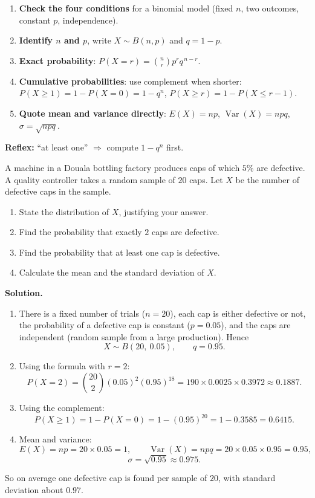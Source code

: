 \documentclass[11pt]{article}
\begin{document}
\begin{methode}
\begin{enumerate}
\item \textbf{Check the four conditions} for a binomial model (fixed $n$, two outcomes, constant $p$, independence).
\item \textbf{Identify $n$ and $p$}, write $X \sim B(n, p)$ and $q = 1 - p$.
\item \textbf{Exact probability}: $P(X = r) = \binom{n}{r} p^{r} q^{\,n-r}$.
\item \textbf{Cumulative probabilities}: use complement when shorter:
$P(X \geq 1) = 1 - P(X = 0) = 1 - q^{n}$,
$P(X \geq r) = 1 - P(X \leq r-1)$.
\item \textbf{Quote mean and variance directly}:
$E(X) = np$, $\operatorname{Var}(X) = npq$, $\sigma = \sqrt{npq}$.
\end{enumerate}
\textbf{Reflex:} ``at least one'' $\Rightarrow$ compute $1 - q^{n}$ first.
\end{methode}

\begin{exoresolu}
A machine in a Douala bottling factory produces caps of which $5\%$ are defective. A quality controller takes a random sample of $20$ caps. Let $X$ be the number of defective caps in the sample.
\begin{enumerate}
\item State the distribution of $X$, justifying your answer.
\item Find the probability that exactly $2$ caps are defective.
\item Find the probability that at least one cap is defective.
\item Calculate the mean and the standard deviation of $X$.
\end{enumerate}
\tcblower
\textbf{Solution.}
\begin{enumerate}
\item There is a fixed number of trials ($n = 20$), each cap is either defective or not, the probability of a defective cap is constant ($p = 0.05$), and the caps are independent (random sample from a large production). Hence
\[ X \sim B(20,\ 0.05), \qquad q = 0.95. \]
\item Using the formula with $r = 2$:
\[ P(X = 2) = \binom{20}{2}(0.05)^{2}(0.95)^{18} = 190 \times 0.0025 \times 0.3972 \approx 0.1887. \]
\item Using the complement:
\[ P(X \geq 1) = 1 - P(X = 0) = 1 - (0.95)^{20} = 1 - 0.3585 = 0.6415. \]
\item Mean and variance:
\[ E(X) = np = 20 \times 0.05 = 1, \qquad \operatorname{Var}(X) = npq = 20 \times 0.05 \times 0.95 = 0.95, \]
\[ \sigma = \sqrt{0.95} \approx 0.975. \]
\end{enumerate}
So on average one defective cap is found per sample of $20$, with standard deviation about $0.97$.
\end{exoresolu}
\end{document}
